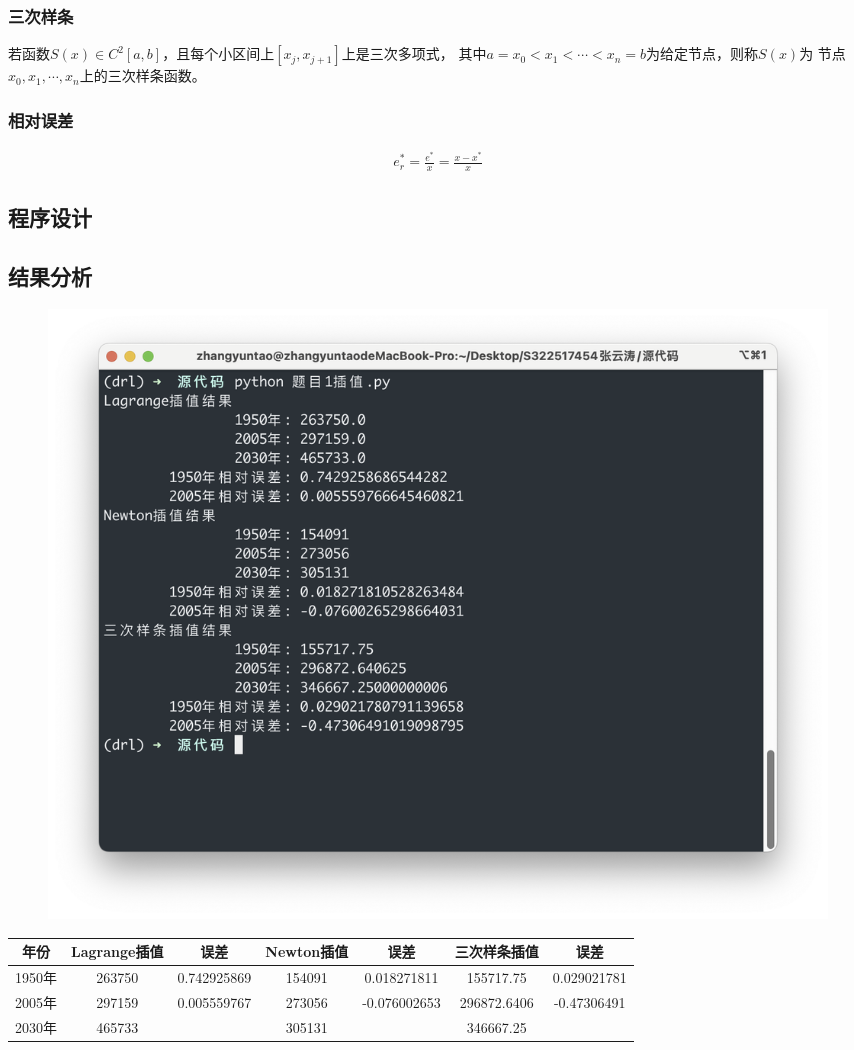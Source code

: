 \documentclass{article}
\begin{document}
\subsubsection{三次样条}
若函数$S(x)\in C^2[a,b]$，且每个小区间上$[x_j,x_{j+1}]$上是三次多项式，
其中$a=x_0<x_1<\cdots<x_n=b$为给定节点，则称$S(x)$为
节点$x_0,x_1,\cdots,x_n$上的三次样条函数。

\subsubsection{相对误差}
\begin{align}
    e_r^* = \frac{e^*}{x} = \frac{x-x^*}{x}
\end{align}
\subsection{程序设计}


\subsection{结果分析}
\begin{figure}[H]
    \centering
    \includegraphics[width=\textwidth]{相关资源/图片/题目1插值运行结果.png} 
\end{figure}

\begin{table}[H]
    \centering
    \begin{tabular}{|c|c|c|c|c|c|c|}
    \hline
        年份 & Lagrange插值 & 误差 & Newton插值 & 误差 & 三次样条插值 & 误差 \\ \hline
        1950年 & 263750 & 0.742925869 & 154091 & 0.018271811 & 155717.75 & 0.029021781 \\ \hline
        2005年 & 297159 & 0.005559767 & 273056 & -0.076002653 & 296872.6406 & -0.47306491 \\ \hline
        2030年 & 465733 & ~ & 305131 & ~ & 346667.25 & \\ \hline
    \end{tabular}
\end{table}
\end{document}
